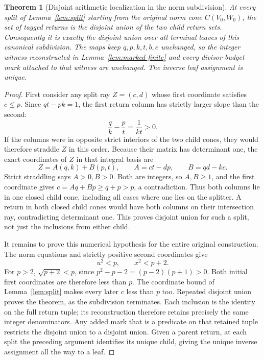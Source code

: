 \documentclass[11pt]{article}
\newtheorem{theorem}{Theorem}[section]
\theoremstyle{definition}\newtheorem{definition}[theorem]{Definition}
\theoremstyle{remark}\newtheorem{remark}[theorem]{Remark}
\begin{document}
\begin{theorem}[Disjoint arithmetic localization in the norm subdivision]
\label{thm:orchard-partition}
At every split of Lemma~\ref{lem:split} starting from
the original norm cone \(C(V_0,W_0)\), the set of tagged
returns is the disjoint union of the two child return sets.
Consequently it is exactly the disjoint union over all
terminal leaves of this canonical subdivision.
The maps keep \(q,p,k,t,b,e\) unchanged, so the integer
witness reconstructed in Lemma~\ref{lem:marked-finite}
and every divisor-budget mark attached to that witness
are unchanged.  The inverse leaf assignment is unique.
\end{theorem}
\begin{proof}
First consider any split ray \(Z=(c,d)\) whose first
coordinate satisfies \(c\le p\).  Since
\(qt-pk=1\), the first return column has strictly larger
slope than the second:
\[
 \frac qk-\frac pt=\frac1{kt}>0.
\]
If the columns were in opposite strict interiors of
the two child cones, they would therefore straddle \(Z\)
in this order.  Because their matrix has determinant
one, the exact coordinates of \(Z\) in that integral
basis are
\[
 Z=A(q,k)+B(p,t),\qquad
 A=ct-dp,\qquad B=qd-kc .
\]
Strict straddling says \(A>0,B>0\).  Both are integers,
so \(A,B\ge1\), and the first coordinate gives
\(c=Aq+Bp\ge q+p>p\), a contradiction.
Thus both columns lie in one closed child cone, including
all cases where one lies on the splitter.  A return in
both closed child cones would have both columns on their
intersection ray, contradicting determinant one.
This proves disjoint union for such a split, not just
the inclusions from either child.

It remains to prove this numerical hypothesis for the
entire original construction.  The norm equations and
strictly positive second coordinates give
\[
 u^2<p,\qquad x^2<p+2 .
\]
For \(p>2\), \(\sqrt{p+2}<p\), since
\(p^2-p-2=(p-2)(p+1)>0\).  Both initial first coordinates
are therefore less than \(p\).  The coordinate bound of
Lemma~\ref{lem:split} makes every later \(c\) less than
\(p\) too.  Repeated disjoint union proves the theorem,
as the subdivision terminates.  Each inclusion is the
identity on the full return tuple; its reconstruction
therefore retains precisely the same integer denominators.
Any added mark that is a predicate on that retained
tuple restricts the disjoint union to a disjoint union.
Given a parent return, at each split the preceding
argument identifies its unique child, giving the
unique inverse assignment all the way to a leaf.
\end{proof}
\end{document}
